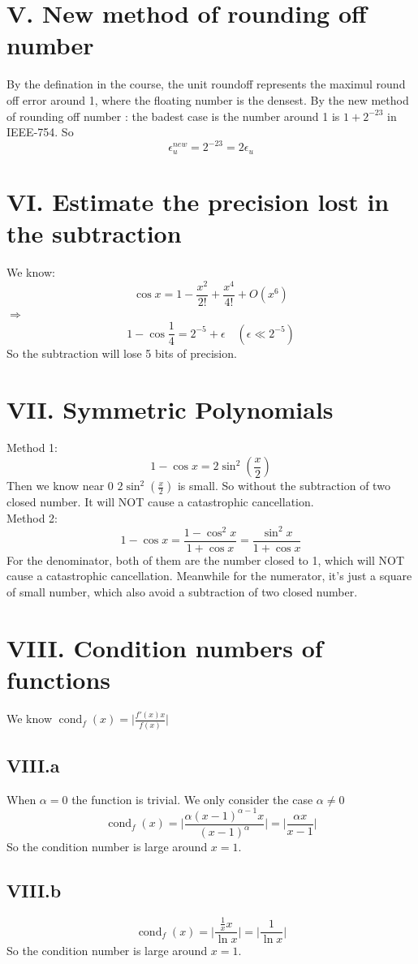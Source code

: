 \documentclass[a4paper]{article}
\begin{document}
\section*{V. New method of rounding off number}
By the defination in the course, the unit roundoff represents the maximul round off error
around 1, where the floating number is the densest. By the new method of rounding off number
: the badest case is the number around 1 is $1 + 2^{-23}$ in IEEE-754. So
\[
\epsilon^{new}_{u} = 2^{-23} = 2\epsilon_{u}
\]


\section*{VI. Estimate the precision lost in the subtraction}
We know:
\[
\cos x = 1 - \frac{x^2}{2!} + \frac{x^4}{4!} + O(x^6)
\]
$\Rightarrow$
\[
1-\cos \frac{1}{4} = 2^{-5} + \epsilon \quad (\epsilon \ll 2^{-5})
\]
So the subtraction will lose 5 bits of precision.

\section*{VII. Symmetric Polynomials}
Method 1:
\[
1- \cos x = 2\sin^2(\frac{x}{2})
\]
Then we know near 0 $2\sin^2(\frac{x}{2})$ is small. So without the 
subtraction of two closed number. It will NOT cause a catastrophic cancellation.
\\
Method 2:
\[
1- \cos x = \frac{1-\cos^2x}{1+ \cos x} = \frac{\sin^2 x}{1+ \cos x}
\]
For the denominator, both of them are the number closed to 1, which will NOT cause a
catastrophic cancellation. Meanwhile for the numerator, it's just a square of small number,
 which also avoid a subtraction of two closed number.


\section*{VIII. Condition numbers of functions}
We know $\operatorname{cond}_{f}(x) = \bigg|\frac{f'(x)x}{f(x)}\bigg|$
\subsection*{VIII.a}
When $\alpha = 0$ the function is trivial. We only consider the case $\alpha \neq 0$
\[
\operatorname{cond}_{f}(x) = \bigg|\frac{\alpha(x-1)^{\alpha-1}x}{(x-1)^\alpha}\bigg|
= \bigg|\frac{\alpha x}{x-1}\bigg|
\]
So the condition number is large around $x = 1$.

\subsection*{VIII.b}
\[
\operatorname{cond}_{f}(x) = \bigg|\frac{\frac{1}{x}x}{\ln x}\bigg|
= \bigg|\frac{1}{\ln x}\bigg|
\]
So the condition number is large around $x = 1$.
\end{document}
